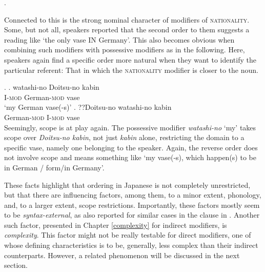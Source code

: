 \documentclass [output=book,colorlinks,citecolor=brown]{langscibook}
\begin{document}
\ex. 

Connected to this is the strong nominal character of modifiers of \textsc{nationality}. Some, but not all, speakers reported that the second order to them suggests a reading like `the only vase IN Germany’. This also becomes obvious when combining such modifiers with possessive modifiers as in the following. Here, speakers again find a specific order more natural when they want to identify the particular referent: That in which the \textsc{nationality} modifier is closer to the noun.

\ex. \ag. watashi-no Doitsu-no kabin\\
I-\textsc{mod} German-\textsc{mod} vase\\
`my German vase(-s)’
\bg. ??Doitsu-no watashi-no kabin\\
German-\textsc{mod} I-\textsc{mod} vase\\

Seemingly, scope is at play again. The possessive modifier \textit{watashi-no} `my’ takes scope over \textit{Doitsu-no kabin}, not just \textit{kabin} alone, restricting the domain to a specific vase, namely one belonging to the speaker. Again, the reverse order does not involve scope and means something like `my vase(-s), which happen(s) to be in German / form/in Germany’.

These facts highlight that ordering in Japanese is not completely unrestricted, but that there are influencing factors, among them, to a minor extent, phonology, and, to a larger extent, scope restrictions. Importantly, these factors mostly seem to be \textit{syntax-external}, as also reported for similar cases in the clause in \citet{ramchand:2014:deriving}. Another such factor, presented in Chapter \ref{complexity} for indirect modifiers, is \textit{complexity}. This factor might not be really testable for direct modifiers, one of whose defining characteristics is to be, generally, less complex than their indirect counterparts. However, a related phenomenon will be discussed in the next section. 
\end{document}
